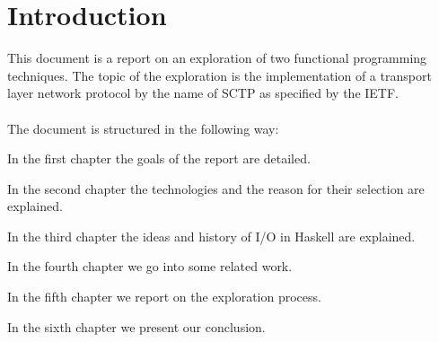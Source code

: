 \chapter*{Introduction}


This document is a report on an exploration of two functional programming techniques.  The topic of the exploration is the implementation of a transport layer network protocol by the name of SCTP as specified by the IETF. 
\\ \hfill \\
The document is structured in the following way:
\begin{description}
\item In the first chapter the goals of the report are detailed. 

\item In the second chapter the technologies and the reason for their selection are explained.

\item In the third chapter the ideas and history of I/O in Haskell are explained.

\item In the fourth chapter we go into some related work.

\item In the fifth chapter we report on the exploration process.

\item In the sixth chapter we present our conclusion.
\end{description}





